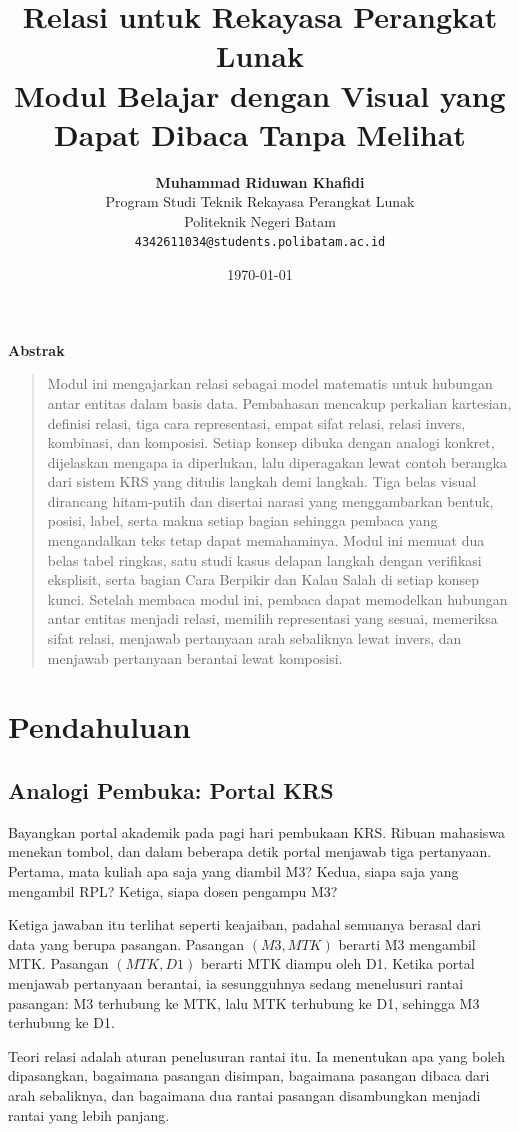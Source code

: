 \documentclass[11pt,a4paper]{article}
\title{\vspace{-1.5cm}\textbf{\sffamily\LARGE Relasi untuk Rekayasa Perangkat Lunak\\ Modul Belajar dengan Visual yang Dapat Dibaca Tanpa Melihat}}
\author{
	\textbf{Muhammad Riduwan Khafidi} \\
	\small Program Studi Teknik Rekayasa Perangkat Lunak \\
	\small Politeknik Negeri Batam \\
	\small \texttt{4342611034@students.polibatam.ac.id}
}
\date{\small\today}
\renewenvironment{abstract}
{\small
	\begin{center}\textbf{\sffamily Abstrak}\end{center}
	\begin{quote}}
	{\end{quote}}
\begin{document}
\maketitle
\thispagestyle{empty}

\begin{abstract}
	Modul ini mengajarkan relasi sebagai model matematis untuk hubungan antar entitas dalam basis data. Pembahasan mencakup perkalian kartesian, definisi relasi, tiga cara representasi, empat sifat relasi, relasi invers, kombinasi, dan komposisi. Setiap konsep dibuka dengan analogi konkret, dijelaskan mengapa ia diperlukan, lalu diperagakan lewat contoh berangka dari sistem KRS yang ditulis langkah demi langkah. Tiga belas visual dirancang hitam-putih dan disertai narasi yang menggambarkan bentuk, posisi, label, serta makna setiap bagian sehingga pembaca yang mengandalkan teks tetap dapat memahaminya. Modul ini memuat dua belas tabel ringkas, satu studi kasus delapan langkah dengan verifikasi eksplisit, serta bagian Cara Berpikir dan Kalau Salah di setiap konsep kunci. Setelah membaca modul ini, pembaca dapat memodelkan hubungan antar entitas menjadi relasi, memilih representasi yang sesuai, memeriksa sifat relasi, menjawab pertanyaan arah sebaliknya lewat invers, dan menjawab pertanyaan berantai lewat komposisi.
\end{abstract}

\section{Pendahuluan}

\subsection{Analogi Pembuka: Portal KRS}

Bayangkan portal akademik pada pagi hari pembukaan KRS. Ribuan mahasiswa menekan tombol, dan dalam beberapa detik portal menjawab tiga pertanyaan. Pertama, mata kuliah apa saja yang diambil M3? Kedua, siapa saja yang mengambil RPL? Ketiga, siapa dosen pengampu M3?

Ketiga jawaban itu terlihat seperti keajaiban, padahal semuanya berasal dari data yang berupa pasangan. Pasangan $(M3, MTK)$ berarti M3 mengambil MTK. Pasangan $(MTK, D1)$ berarti MTK diampu oleh D1. Ketika portal menjawab pertanyaan berantai, ia sesungguhnya sedang menelusuri rantai pasangan: M3 terhubung ke MTK, lalu MTK terhubung ke D1, sehingga M3 terhubung ke D1.

Teori relasi adalah aturan penelusuran rantai itu. Ia menentukan apa yang boleh dipasangkan, bagaimana pasangan disimpan, bagaimana pasangan dibaca dari arah sebaliknya, dan bagaimana dua rantai pasangan disambungkan menjadi rantai yang lebih panjang.
\end{document}
